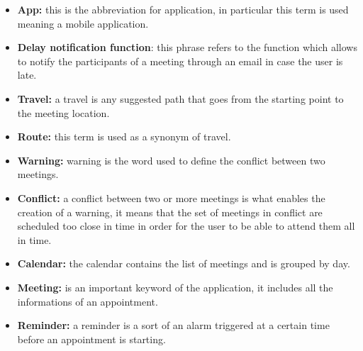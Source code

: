 \begin{itemize}

\item  \textbf{App:} this is the abbreviation for application, in particular this term is used meaning a mobile application.

\item  \textbf{Delay notification function}: this phrase refers to the function which allows to notify the participants of a meeting through an email in case the user is late.

\item  \textbf{Travel:} a travel is any suggested path that goes from the starting point to the meeting location.

\item  \textbf{Route:} this term is used as a synonym of travel.

\item  \textbf{Warning:} warning is the word used to define the conflict between two meetings.

\item  \textbf{Conflict:} a conflict between two or more meetings is what enables the creation of a warning, it means that the set of meetings in conflict are scheduled too close in time in order for the user to be able to attend them all in time.

\item  \textbf{Calendar:} the calendar contains the list of meetings and is grouped by day.

\item  \textbf{Meeting:} is an important keyword of the application, it includes all the informations of an appointment.

\item  \textbf{Reminder:} a reminder is a sort of an alarm triggered at a certain time before an appointment is starting.


\end{itemize}